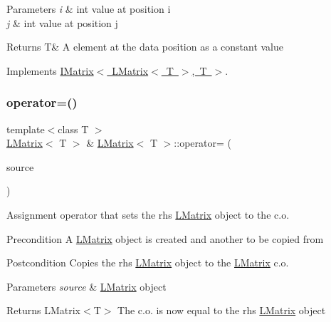 \begin{DoxyParams}{Parameters}
{\em i} & int value at position i \\
\hline
{\em j} & int value at position j \\
\hline
\end{DoxyParams}
\begin{DoxyReturn}{Returns}
T\& A element at the data position as a constant value 
\end{DoxyReturn}


Implements \mbox{\hyperlink{class_i_matrix_a2abf1a0d2454051da3ccf9cacf12797e}{I\+Matrix$<$ L\+Matrix$<$ T $>$, T $>$}}.

\mbox{\label{class_l_matrix_ad4feb8e3706e9ce8fdb07e63d985f52f}} 
\subsubsection{\texorpdfstring{operator=()}{operator=()}\hspace{0.1cm}{\footnotesize\ttfamily [1/2]}}
{\footnotesize\ttfamily template$<$class T $>$ \\
\mbox{\hyperlink{class_l_matrix}{L\+Matrix}}$<$ T $>$ \& \mbox{\hyperlink{class_l_matrix}{L\+Matrix}}$<$ T $>$\+::operator= (\begin{DoxyParamCaption}\item[{const \mbox{\hyperlink{class_l_matrix}{L\+Matrix}}$<$ T $>$ \&}]{source }\end{DoxyParamCaption})\hspace{0.3cm}{\ttfamily [virtual]}}



Assignment operator that sets the rhs \mbox{\hyperlink{class_l_matrix}{L\+Matrix}} object to the c.\+o. 

\begin{DoxyPrecond}{Precondition}
A \mbox{\hyperlink{class_l_matrix}{L\+Matrix}} object is created and another to be copied from 
\end{DoxyPrecond}
\begin{DoxyPostcond}{Postcondition}
Copies the rhs \mbox{\hyperlink{class_l_matrix}{L\+Matrix}} object to the \mbox{\hyperlink{class_l_matrix}{L\+Matrix}} c.\+o. 
\end{DoxyPostcond}

\begin{DoxyParams}{Parameters}
{\em source} & \mbox{\hyperlink{class_l_matrix}{L\+Matrix}} object \\
\hline
\end{DoxyParams}
\begin{DoxyReturn}{Returns}
L\+Matrix$<$\+T$>$ The c.\+o. is now equal to the rhs \mbox{\hyperlink{class_l_matrix}{L\+Matrix}} object 
\end{DoxyReturn}


